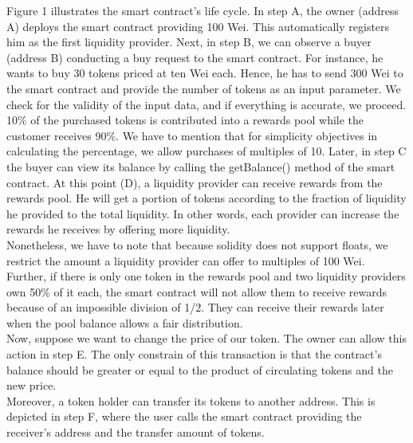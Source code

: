 \documentclass[12pt,a4paper]{article}
\begin{document}
Figure 1 illustrates the smart contract's life cycle. In step A, the owner
(address A) deploys the smart contract providing 100 Wei. This automatically
registers him as the first liquidity provider. Next, in step B, we can observe a
buyer (address B) conducting a buy request to the smart contract. For instance,
he wants to buy 30 tokens priced at ten Wei each. Hence, he has to send 300 Wei
to the smart contract and provide the number of tokens as an input parameter. We
check for the validity of the input data, and if everything is accurate, we
proceed. 10\% of the purchased tokens is contributed into a rewards pool while
the customer receives 90\%. We have to mention that for simplicity objectives in
calculating the percentage, we allow purchases of multiples of 10. Later, in
step C the buyer can view its balance by calling the getBalance() method of the
smart contract. At this point (D), a liquidity provider can receive rewards from
the rewards pool. He will get a portion of tokens according to the fraction of
liquidity he provided to the total liquidity. In other words, each provider can
increase the rewards he receives by offering more liquidity. \\

Nonetheless, we have to note that because solidity does not support floats, we
restrict the amount a liquidity provider can offer to multiples of 100 Wei.
Further, if there is only one token in the rewards pool and two liquidity
providers own 50\% of it each, the smart contract will not allow them to receive
rewards because of an impossible division of 1/2. They can receive their rewards
later when the pool balance allows a fair distribution. \\

Now, suppose we want to change the price of our token. The owner can allow this
action in step E. The only constrain of this transaction is that the contract's
balance should be greater or equal to the product of circulating tokens and the
new price. \\

Moreover, a token holder can transfer its tokens to another address. This is
depicted in step F, where the user calls the smart contract providing the
receiver's address and the transfer amount of tokens. \\
\end{document}
